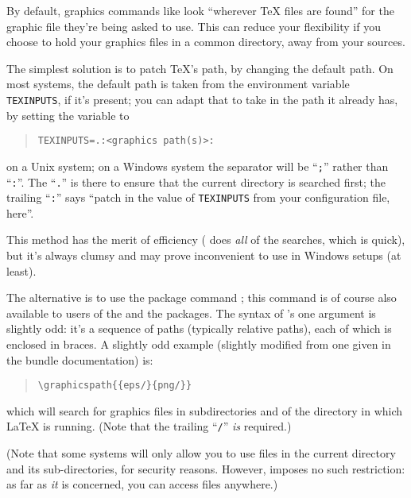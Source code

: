 
By default, graphics commands like  look
``wherever \TeX{} files are found'' for the graphic file they're being
asked to use.  This can reduce your flexibility if you choose to hold
your graphics files in a common directory, away from your \AllTeX{}
sources.

The simplest solution is to patch \TeX{}'s path, by changing the
default path.  On most systems, the default path is taken from the
environment variable \texttt{TEXINPUTS}, if it's present; you can adapt that
to take in the path it already has, by setting the variable to
\begin{quote}
\begin{verbatim}
TEXINPUTS=.:<graphics path(s)>:
\end{verbatim}
\end{quote}
on a Unix system; on a Windows system the separator will be ``\texttt{;}''
rather than ``\texttt{:}''.  The ``\texttt{.}'' is there to ensure
that the current directory is searched first; the trailing
``\texttt{:}'' says ``patch in the value of \texttt{TEXINPUTS} from
your configuration file, here''.

This method has the merit of efficiency (\AllTeX{} does \emph{all} of
the searches, which is quick), but it's always clumsy and may prove
inconvenient to use in Windows setups (at least).

The alternative is to use the  package command
; this command is of course also available to users
of the  and the  packages.  The
syntax of 's one argument is slightly odd: it's a
sequence of paths (typically relative paths), each of which is
enclosed in braces.  A slightly odd example (slightly modified from one
given in the  bundle documentation) is:
\begin{quote}
\begin{verbatim}
\graphicspath{{eps/}{png/}}
\end{verbatim}
\end{quote}
which will search for graphics files in subdirectories  and
 of the directory in which \LaTeX{} is running.  (Note that
the trailing ``\texttt{/}'' \emph{is} required.)

(Note that some \AllTeX{} systems will only allow you to use files in
the current directory and its sub-directories, for security reasons.
However,  imposes no such restriction: as far as
\emph{it} is concerned, you can access files anywhere.)

